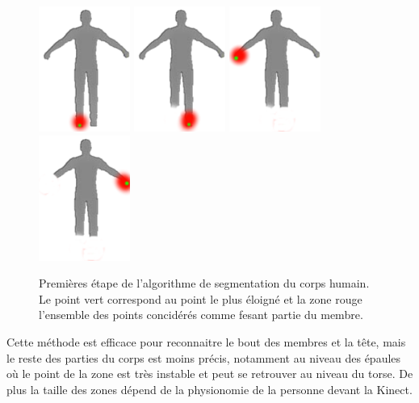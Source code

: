 \begin{figure}[!ht]
  \begin{center}
    \includegraphics[width=3cm]{image/humanFootR.png}
    \includegraphics[width=3cm]{image/humanFootL.png}
    \includegraphics[width=3cm]{image/humanHandR.png}
    \includegraphics[width=3cm]{image/humanHandL.png}
    \caption{Premières étape de l'algorithme de segmentation du corps humain. Le point vert correspond au point le plus éloigné et la zone rouge
    l'ensemble des points concidérés comme fesant partie du membre.}
    \label{fig:geodesique}
  \end{center}
\end{figure}

Cette méthode est efficace pour reconnaitre le bout des membres et la tête, mais le reste des parties du corps est moins précis, notamment au niveau
des épaules où le point de la zone est très instable et peut se retrouver au niveau du torse. De plus la taille des zones dépend de la 
physionomie de la personne devant la Kinect. 

